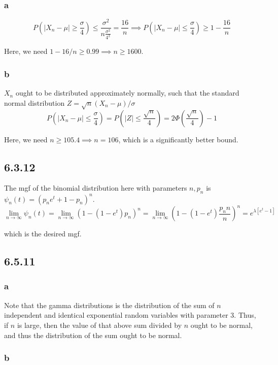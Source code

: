 \documentclass[12pt,letterpaper]{article}
\theoremstyle{definition}
\begin{document}
\subsubsection*{a}

\[
  P(|X_n - \mu| \geq \frac{\sigma}{4}) \leq
  \frac{\sigma^2}{n\frac{\sigma^2}{4^2}} = \frac{16}{n} \implies P(|X_n - \mu|
  \leq \frac{\sigma}{4}) \geq 1 - \frac{16}{n}
\]

Here, we need $1 - 16/n \geq 0.99 \implies n \geq 1600$.

\subsubsection*{b}

$X_n$ ought to be distributed approximately normally, such that the standard
normal distribution $Z = \sqrt{n}(X_n - \mu)/\sigma$
\[
  P(|X_n - \mu| \leq \frac{\sigma}{4}) = P(|Z| \leq \frac{\sqrt{n}}{4}) =
  2\Phi(\frac{\sqrt{n}}{4}) - 1
\]

Here, we need $n\geq 105.4 \implies n = 106$, which is a significantly better bound.


\subsection*{6.3.12}

The mgf of the binomial distribution here with parameters $n, p_n$ is $\psi_n(t)
= (p_ne^{t} + 1 - p_n)^n$.
\[
  \lim_{n\rightarrow \infty}\psi_n(t) = \lim_{n\rightarrow \infty}(1 -(1 -
  e^t)p_n)^n = \lim_{n\rightarrow \infty}(1 - (1-e^t)\frac{p_nn}{n})^n = e^{\lambda[e^t-1]}
\]

which is the desired mgf.

\subsection*{6.5.11}

\subsubsection*{a}

Note that the gamma distributions is the distribution of the sum of $n$
independent and identical exponential random variables with parameter 3. Thus,
if $n$ is large, then the value of that above sum divided by $n$ ought to be
normal, and thus the distribution of the sum ought to be normal.

\subsubsection*{b}
\end{document}
